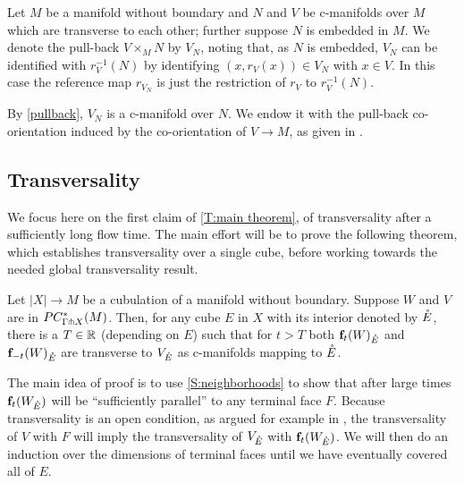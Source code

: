 \begin{definition}
	Let $M$ be a manifold without boundary and $N$ and $V$ be c-manifolds over $M$ which are transverse to each other; further suppose $N$ is embedded in $M$.
	We denote the pull-back $V \times_M N$ by $V_N$, noting that, as $N$ is embedded, $V_N$ can be identified with $r_V^{-1}(N)$ by identifying $(x, r_V(x)) \in V_N$ with $x \in V$.
	In this case the reference map $r_{V_N}$ is just the restriction of $r_V$ to $r_V^{-1}(N)$.

	By \cref{pullback}, $V_N$ is a c-manifold over $N$. We endow it with the pull-back co-orientation induced by the co-orientation of $V\to M$, as given in \cite[Sections 3.5.1 and 3.5.2]{medina2022foundations}. %
\end{definition}

\subsection{Transversality}

We focus here on the first claim of \cref{T:main theorem}, of transversality after a sufficiently long flow time.
The main effort will be to prove the following theorem, which establishes transversality over
a single cube, before working towards the needed global transversality result.



\begin{theorem}\label{T:transversality}
	Let $|X| \to M$ be a cubulation of a manifold without boundary.
	Suppose $W$ and $V$ are in $PC_{\Gamma \pitchfork X}^*(M)$.
	Then, for any cube $E$ in $X$ with its interior denoted by $\mathring{E}$, there is a $T \in \mathbb{R}$ (depending on $E$) such that for $t > T$ both $\mathbf{f}_t(W)_{\mathring{E}}$ and $\mathbf{f}_{-t}(W)_{\mathring{E}}$ are transverse to $V_{\mathring{E}}$ as c-manifolds mapping to $\mathring{E}$.
\end{theorem}


The main idea of proof is to use \cref{S:neighborhoods} to show that after large times $\mathbf{f}_t(W_{\mathring{E}})$ will be
``sufficiently parallel'' to any terminal face $F$.
Because transversality is an open condition, as argued for example in \cite[Section 1.6]{GuPo74}, the transversality of $V$ with $F$ will imply the transversality of $V_{\mathring{E}}$ with $\mathbf{f}_t(W_{\mathring{E}})$.
We will then do an induction over the dimensions of terminal faces until we have eventually covered all of $E$.

